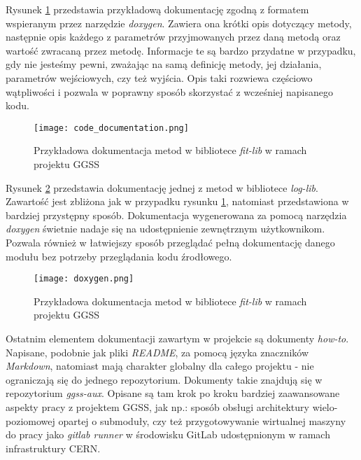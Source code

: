 Rysunek \ref{fig:code_documentation} przedstawia przykładową dokumentację zgodną z formatem wspieranym przez narzędzie \emph{doxygen}. Zawiera ona krótki opis dotyczący metody, następnie opis każdego z parametrów przyjmowanych przez daną metodą oraz wartość zwracaną przez metodę. Informacje te są bardzo przydatne w przypadku, gdy nie jesteśmy pewni, zważając na samą definicję metody, jej działania, parametrów wejściowych, czy też wyjścia. Opis taki rozwiewa częściowo wątpliwości i pozwala w poprawny sposób skorzystać z wcześniej napisanego kodu.
\begin{figure}[H]
    \centering
    \texttt{[image: code\_documentation.png]}
    \caption{Przykładowa dokumentacja metod w bibliotece \emph{fit-lib} w ramach projektu GGSS}
    \label{fig:code_documentation}
\end{figure} %

Rysunek \ref{fig:doxygen} przedstawia dokumentację jednej z metod w bibliotece \emph{log-lib}. Zawartość jest zbliżona jak w przypadku rysunku \ref{fig:code_documentation}, natomiast przedstawiona w bardziej przystępny sposób. Dokumentacja wygenerowana za pomocą narzędzia \emph{doxygen} świetnie nadaje się na udostępnienie zewnętrznym użytkownikom. Pozwala również w łatwiejszy sposób przeglądać pełną dokumentację danego modułu bez potrzeby przeglądania kodu źrodłowego.

\begin{figure}[H]
    \centering
    \texttt{[image: doxygen.png]}
    \caption{Przykładowa dokumentacja metod w bibliotece \emph{fit-lib} w ramach projektu GGSS}
    \label{fig:doxygen}
\end{figure}

Ostatnim elementem dokumentacji zawartym w projekcie są dokumenty \emph{how-to}. Napisane, podobnie jak pliki \emph{README}, za pomocą języka znaczników \emph{Markdown}, natomiast mają charakter globalny dla całego projektu - nie ograniczają się do jednego repozytorium. Dokumenty takie znajdują się w repozytorium \emph{ggss-aux}. Opisane są tam krok po kroku bardziej zaawansowane aspekty pracy z projektem GGSS, jak np.: sposób obsługi architektury wielo-poziomowej opartej o submoduły, czy też przygotowywanie wirtualnej maszyny do pracy jako \emph{gitlab runner} w środowisku GitLab udostępnionym w ramach infrastruktury CERN.

